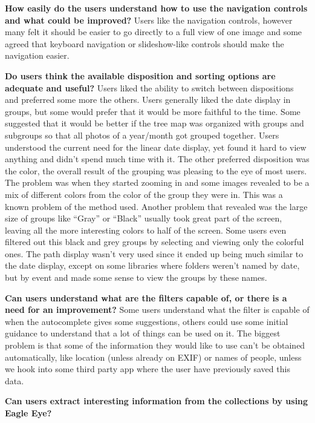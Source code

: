 {\textbf{How easily do the users understand how to use the navigation controls and what could be improved?}
Users like the navigation controls, however many felt it should be easier to go directly to a full view of one image and some agreed that keyboard navigation or slideshow-like controls should make the navigation easier.




\textbf{Do users think the available disposition and sorting options are adequate and useful?}
Users liked the ability to switch between dispositions and preferred some more the others.
Users generally liked the date display in groups, but some would prefer that it would be more faithful to the time. Some suggested that it would be better if the tree map was organized with groups and subgroups so that all photos of a year/month got grouped together. Users understood the current need for the linear date display, yet found it hard to view anything and didn't spend much time with it.
The other preferred disposition was the color, the overall result of the grouping was pleasing to the eye of most users. The problem was when they started zooming in and some images revealed to be a mix of different colors from the color of the group they were in. This was a known problem of the method used. Another problem that revealed was the large size of groups like ``Gray'' or ``Black'' usually took great part of the screen, leaving all the more interesting colors to half of the screen. Some users even filtered out this black and grey groups by selecting and viewing only the colorful ones.
The path display wasn't very used since it ended up being much similar to the date display, except on some libraries where folders weren't named by date, but by event and made some sense to view the groups by these names. 




\textbf{Can users understand what are the filters capable of, or there is a need for an improvement?}
Some users understand what the filter is capable of when the autocomplete gives some suggestions, others could use some initial guidance to understand that a lot of things can be used on it. The biggest problem is that some of the information they would like to use can't be obtained automatically, like location (unless already on EXIF) or names of people, unless we hook into some third party app where the user have previously saved this data.




\textbf{Can users extract interesting information from the collections by using Eagle Eye?}

}
